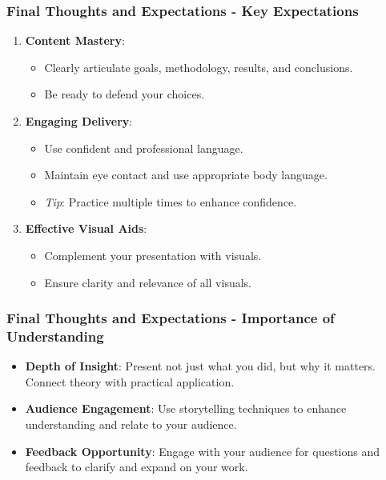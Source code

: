 \documentclass[aspectratio=169]{beamer}
\begin{document}
\begin{frame}[fragile]
    \frametitle{Final Thoughts and Expectations - Key Expectations}
    \begin{enumerate}
        \item \textbf{Content Mastery}:
        \begin{itemize}
            \item Clearly articulate goals, methodology, results, and conclusions.
            \item Be ready to defend your choices.
        \end{itemize}
        
        \item \textbf{Engaging Delivery}:
        \begin{itemize}
            \item Use confident and professional language.
            \item Maintain eye contact and use appropriate body language. 
            \item \textit{Tip}: Practice multiple times to enhance confidence.
        \end{itemize}
        
        \item \textbf{Effective Visual Aids}:
        \begin{itemize}
            \item Complement your presentation with visuals.
            \item Ensure clarity and relevance of all visuals.
        \end{itemize}
    \end{enumerate}
\end{frame}

\begin{frame}[fragile]
    \frametitle{Final Thoughts and Expectations - Importance of Understanding}
    \begin{itemize}
        \item \textbf{Depth of Insight}: 
            Present not just what you did, but why it matters. Connect theory with practical application.
            
        \item \textbf{Audience Engagement}: 
            Use storytelling techniques to enhance understanding and relate to your audience.
            
        \item \textbf{Feedback Opportunity}: 
            Engage with your audience for questions and feedback to clarify and expand on your work.
    \end{itemize}
\end{frame}
\end{document}
